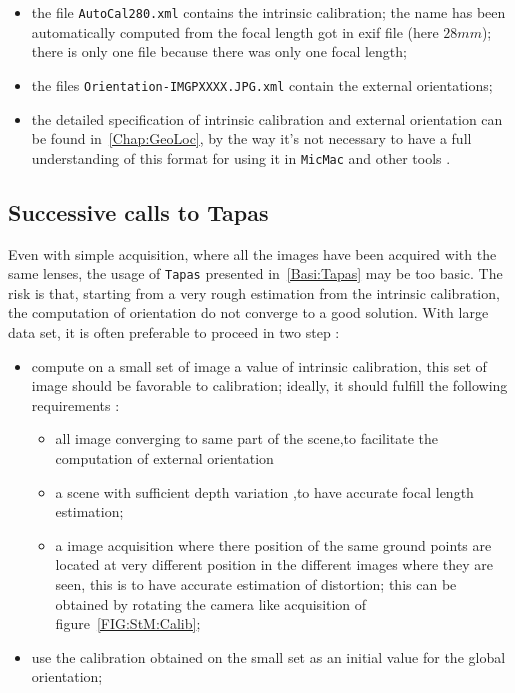 \begin{itemize}
   \item the file {\tt AutoCal280.xml} contains the intrinsic calibration; the name
	 has been automatically computed from the focal length got in exif file (here $28 mm$);
	 there is only one file because there was only one focal length;

   \item   the  files {\tt Orientation-IMGPXXXX.JPG.xml} contain the external orientations;

   \item  the detailed specification of intrinsic calibration and external orientation can
	  be found in~\ref{Chap:GeoLoc}, by the way it's not necessary to have a full
	  understanding of this format for using it in {\tt MicMac} and  other tools .
\end{itemize}


\subsection{Successive calls to Tapas}

\label{Succ:Call:Tapas}

Even with simple acquisition, where all the images have been acquired with
the same lenses, the usage of {\tt Tapas} presented in~\ref{Basi:Tapas} may
be too basic.  The risk is that, starting from a very rough estimation from the
intrinsic calibration, the  computation of orientation do not converge to a
good solution.
With large data set, it is often preferable to proceed in two step :

\begin{itemize}
   \item  compute on a small set of image a value of intrinsic calibration,
	  this set of image should be favorable to calibration; ideally,
	  it should fulfill the following requirements :

\begin{itemize}
  \item  all image converging  to same part of the scene,to facilitate the computation
	 of external  orientation

   \item  a scene with sufficient depth variation ,to have accurate focal length estimation;

   \item  a image acquisition where there position of the same ground points are located at
	  very different position in the different images where they are seen, this is to
	  have accurate estimation of distortion; this can be obtained by rotating the camera
	  like acquisition of figure~\ref{FIG:StM:Calib};

\end{itemize}
   \item  use the calibration obtained on the small set as an initial value for
	  the global orientation;
\end{itemize}


